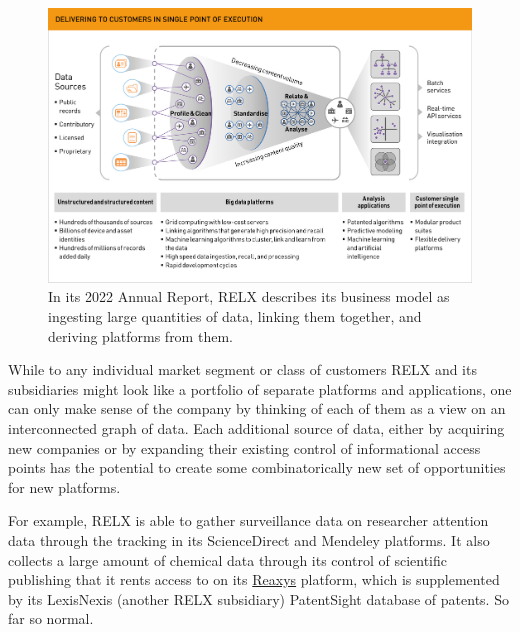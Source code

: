 \documentclass{article}
\begin{document}
\begin{figure}[h!]
\includegraphics[width=\linewidth]{img/RELX_Pipeline_2022.png}

\caption{In its 2022 Annual Report, RELX describes its business model as
ingesting large quantities of data, linking them together, and deriving
platforms from them. \cite{relxAnnualReport20222023} }
\label{fig:relx}
\end{figure}

While to any individual market segment or class of customers RELX and
its subsidiaries might look like a portfolio of separate platforms and
applications, one can only make sense of the company by thinking of each
of them as a view on an interconnected graph of data. Each additional source of data, either by acquiring new
companies or by expanding their existing control of informational access
points has the potential to create some combinatorically new set of
opportunities for new platforms.

For example, RELX is able to gather surveillance data on researcher
attention data through the tracking in its ScienceDirect and Mendeley
platforms. It also collects a large amount of chemical data through its
control of scientific publishing that it rents access to on its
\href{https://www.elsevier.com/en-gb/solutions/reaxys}{Reaxys} platform,
which is supplemented by its LexisNexis (another RELX subsidiary)
PatentSight database of patents. So far so normal.
\end{document}

